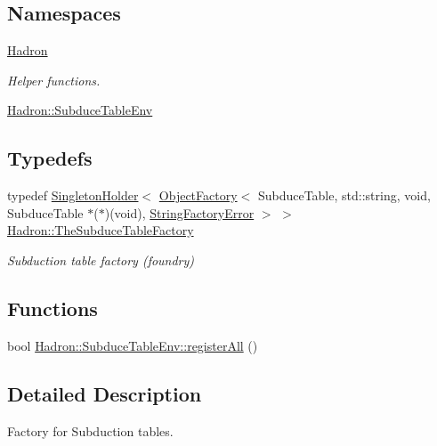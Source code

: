 \subsection*{Namespaces}
\begin{DoxyCompactItemize}
\item 
 \mbox{\hyperlink{namespaceHadron}{Hadron}}
\begin{DoxyCompactList}\small\item\em Helper functions. \end{DoxyCompactList}\item 
 \mbox{\hyperlink{namespaceHadron_1_1SubduceTableEnv}{Hadron\+::\+Subduce\+Table\+Env}}
\end{DoxyCompactItemize}
\subsection*{Typedefs}
\begin{DoxyCompactItemize}
\item 
typedef \mbox{\hyperlink{classUtil_1_1SingletonHolder}{Singleton\+Holder}}$<$ \mbox{\hyperlink{classUtil_1_1ObjectFactory}{Object\+Factory}}$<$ Subduce\+Table, std\+::string, void, Subduce\+Table $\ast$($\ast$)(void), \mbox{\hyperlink{structUtil_1_1StringFactoryError}{String\+Factory\+Error}} $>$ $>$ \mbox{\hyperlink{namespaceHadron_a48cb722d69c0afc5a2ebda0eaf6fea13}{Hadron\+::\+The\+Subduce\+Table\+Factory}}
\begin{DoxyCompactList}\small\item\em Subduction table factory (foundry) \end{DoxyCompactList}\end{DoxyCompactItemize}
\subsection*{Functions}
\begin{DoxyCompactItemize}
\item 
bool \mbox{\hyperlink{namespaceHadron_1_1SubduceTableEnv_a168dd05273b8d8f0ca1cfb57fbe63e23}{Hadron\+::\+Subduce\+Table\+Env\+::register\+All}} ()
\end{DoxyCompactItemize}


\subsection{Detailed Description}
Factory for Subduction tables. 

